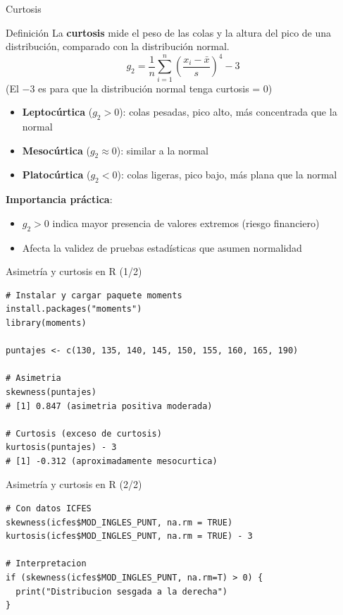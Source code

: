 \documentclass[aspectratio=169, 11pt]{beamer}
\begin{document}
\begin{frame}{Curtosis}
\begin{block}{Definición}
La \textbf{curtosis} mide el peso de las colas y la altura del pico de una distribución, comparado con la distribución normal.
\[
g_2 = \frac{1}{n} \sum_{i=1}^n \left(\frac{x_i - \bar{x}}{s}\right)^4 - 3
\]
(El $-3$ es para que la distribución normal tenga curtosis = 0)
\end{block}

\begin{itemize}
\item \textbf{Leptocúrtica} ($g_2 > 0$): colas pesadas, pico alto, más concentrada que la normal
\item \textbf{Mesocúrtica} ($g_2 \approx 0$): similar a la normal
\item \textbf{Platocúrtica} ($g_2 < 0$): colas ligeras, pico bajo, más plana que la normal
\end{itemize}

\vspace{0.5em}
\textbf{Importancia práctica}:
\begin{itemize}
\item $g_2 > 0$ indica mayor presencia de valores extremos (riesgo financiero)
\item Afecta la validez de pruebas estadísticas que asumen normalidad
\end{itemize}
\end{frame}

\begin{frame}[fragile]{Asimetría y curtosis en R (1/2)}
\begin{lstlisting}
# Instalar y cargar paquete moments
install.packages("moments")
library(moments)

puntajes <- c(130, 135, 140, 145, 150, 155, 160, 165, 190)

# Asimetria
skewness(puntajes)
# [1] 0.847 (asimetria positiva moderada)

# Curtosis (exceso de curtosis)
kurtosis(puntajes) - 3
# [1] -0.312 (aproximadamente mesocurtica)
\end{lstlisting}
\end{frame}

\begin{frame}[fragile]{Asimetría y curtosis en R (2/2)}
\begin{lstlisting}
# Con datos ICFES
skewness(icfes$MOD_INGLES_PUNT, na.rm = TRUE)
kurtosis(icfes$MOD_INGLES_PUNT, na.rm = TRUE) - 3

# Interpretacion
if (skewness(icfes$MOD_INGLES_PUNT, na.rm=T) > 0) {
  print("Distribucion sesgada a la derecha")
}
\end{lstlisting}
\end{frame}
\end{document}
